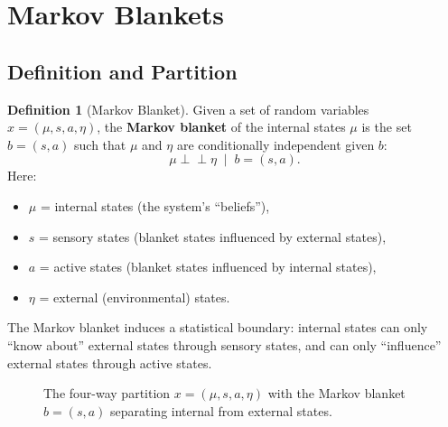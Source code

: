 \documentclass[11pt,a4paper]{article}
\theoremstyle{definition}
\newtheorem{definition}[theorem]{Definition}
\begin{document}
\section{Markov Blankets}
\label{sec:mb}

\subsection{Definition and Partition}

\begin{definition}[Markov Blanket]
Given a set of random variables $x = (\mu, s, a, \eta)$, the \textbf{Markov
blanket} of the internal states $\mu$ is the set $b = (s, a)$ such that $\mu$
and $\eta$ are conditionally independent given $b$:
\begin{equation}
  \mu \perp\!\!\!\perp \eta \;\mid\; b = (s, a).
\end{equation}
Here:
\begin{itemize}[leftmargin=2em]
  \item $\mu$ = internal states (the system's ``beliefs''),
  \item $s$ = sensory states (blanket states influenced by external states),
  \item $a$ = active states (blanket states influenced by internal states),
  \item $\eta$ = external (environmental) states.
\end{itemize}
\end{definition}

The Markov blanket induces a statistical boundary: internal states can only
``know about'' external states through sensory states, and can only
``influence'' external states through active states.

\begin{figure}[h]
\centering
{}
\caption{The four-way partition $x = (\mu, s, a, \eta)$ with the Markov blanket
$b = (s, a)$ separating internal from external states.}
\label{fig:mb}
\end{figure}
\end{document}
